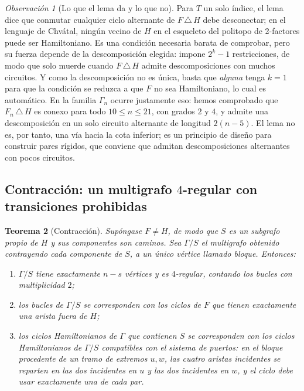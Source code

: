 \documentclass[11pt,a4paper]{article}
\newtheorem{teorema}{Teorema}[section]
\theoremstyle{definition}
\theoremstyle{remark}
\newtheorem{observacion}[teorema]{Observación}
\begin{document}
\begin{observacion}[Lo que el lema da y lo que no]\label{obs:alternancia}
Para $T$ un solo índice, el lema dice que conmutar cualquier ciclo alternante de $F\,\triangle\,H$ debe desconectar; en el lenguaje de Chvátal, ningún vecino de $H$ en el esqueleto del politopo de 2-factores puede ser Hamiltoniano. Es una condición necesaria barata de comprobar, pero su fuerza depende de la descomposición elegida: impone $2^k-1$ restricciones, de modo que solo muerde cuando $F\,\triangle\,H$ admite descomposiciones con muchos circuitos. Y como la descomposición no es única, basta que \emph{alguna} tenga $k=1$ para que la condición se reduzca a que $F$ no sea Hamiltoniano, lo cual es automático. En la familia $\Gamma_n$ ocurre justamente eso: hemos comprobado que $F_n\,\triangle\,H$ es conexo para todo $10\le n\le21$, con grados $2$ y $4$, y admite una descomposición en un solo circuito alternante de longitud $2(n-5)$. El lema no es, por tanto, una vía hacia la cota inferior; es un principio de diseño para construir pares rígidos, que conviene que admitan descomposiciones alternantes con pocos circuitos.
\end{observacion}

\subsection{Contracción: un multigrafo \texorpdfstring{$4$}{4}-regular con transiciones prohibidas}

\begin{teorema}[Contracción]\label{thm:contraccion}
Supóngase $F\ne H$, de modo que $S$ es un subgrafo propio de $H$ y sus componentes son caminos. Sea $\Gamma/S$ el multigrafo obtenido contrayendo cada componente de $S$, a un único vértice llamado \emph{bloque}. Entonces:
\begin{enumerate}[label=(\alph*)]
\item $\Gamma/S$ tiene exactamente $n-s$ vértices y es $4$-regular, contando los bucles con multiplicidad $2$;
\item los bucles de $\Gamma/S$ se corresponden con los ciclos de $F$ que tienen exactamente una arista fuera de $H$;
\item los ciclos Hamiltonianos de $\Gamma$ que contienen $S$ se corresponden con los ciclos Hamiltonianos de $\Gamma/S$ \emph{compatibles} con el sistema de puertos: en el bloque procedente de un tramo de extremos $u,w$, las cuatro aristas incidentes se reparten en las dos incidentes en $u$ y las dos incidentes en $w$, y el ciclo debe usar exactamente una de cada par.
\end{enumerate}
\end{teorema}
\end{document}
